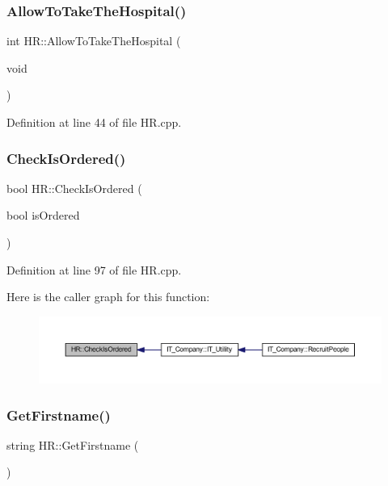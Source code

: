 \subsubsection{\texorpdfstring{Allow\+To\+Take\+The\+Hospital()}{AllowToTakeTheHospital()}}
{\footnotesize\ttfamily int H\+R\+::\+Allow\+To\+Take\+The\+Hospital (\begin{DoxyParamCaption}\item[{void}]{ }\end{DoxyParamCaption})}



Definition at line 44 of file H\+R.\+cpp.

\mbox{\label{class_h_r_af2203b0b515794db46c12b02bc9b9bd2}} 
\subsubsection{\texorpdfstring{Check\+Is\+Ordered()}{CheckIsOrdered()}}
{\footnotesize\ttfamily bool H\+R\+::\+Check\+Is\+Ordered (\begin{DoxyParamCaption}\item[{bool}]{is\+Ordered }\end{DoxyParamCaption})}



Definition at line 97 of file H\+R.\+cpp.

Here is the caller graph for this function\+:
\nopagebreak
\begin{figure}[H]
\begin{center}
\leavevmode
\includegraphics[width=350pt]{class_h_r_af2203b0b515794db46c12b02bc9b9bd2_icgraph}
\end{center}
\end{figure}
\mbox{\label{class_h_r_a03a185de9601109b13c6a34c381b7b6f}} 
\subsubsection{\texorpdfstring{Get\+Firstname()}{GetFirstname()}}
{\footnotesize\ttfamily string H\+R\+::\+Get\+Firstname (\begin{DoxyParamCaption}{ }\end{DoxyParamCaption})}



